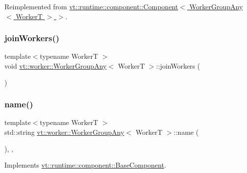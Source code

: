 Reimplemented from \hyperlink{structvt_1_1runtime_1_1component_1_1_component_a7f07384d294e59796add9ce6be2d6410}{vt\+::runtime\+::component\+::\+Component$<$ Worker\+Group\+Any$<$ Worker\+T $>$ $>$}.

\mbox{\label{structvt_1_1worker_1_1_worker_group_any_ac0e40c916ea7620e2985ed29f66a5701}} 
\subsubsection{\texorpdfstring{join\+Workers()}{joinWorkers()}}
{\footnotesize\ttfamily template$<$typename WorkerT $>$ \\
void \hyperlink{structvt_1_1worker_1_1_worker_group_any}{vt\+::worker\+::\+Worker\+Group\+Any}$<$ WorkerT $>$\+::join\+Workers (\begin{DoxyParamCaption}{ }\end{DoxyParamCaption})}

\mbox{\label{structvt_1_1worker_1_1_worker_group_any_a29dc03c300f442508501671d9ec1eecd}} 
\subsubsection{\texorpdfstring{name()}{name()}}
{\footnotesize\ttfamily template$<$typename WorkerT $>$ \\
std\+::string \hyperlink{structvt_1_1worker_1_1_worker_group_any}{vt\+::worker\+::\+Worker\+Group\+Any}$<$ WorkerT $>$\+::name (\begin{DoxyParamCaption}{ }\end{DoxyParamCaption})\hspace{0.3cm}{\ttfamily [inline]}, {\ttfamily [override]}, {\ttfamily [virtual]}}



Implements \hyperlink{structvt_1_1runtime_1_1component_1_1_base_component_a7701485f3539f78d42e6bad47fc7eb78}{vt\+::runtime\+::component\+::\+Base\+Component}.


